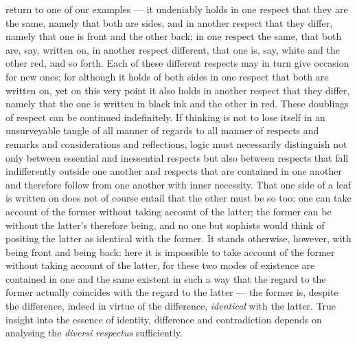 \documentclass[12pt,a4paper]{book}
\begin{document}
return to one of our examples --- it undeniably holds in one respect that they
are the same, namely that both are sides, and in another respect that they
differ, namely that one is front and the other back; in one respect the same,
that both are, say, written on, in another respect different, that one is, say,
white and the other red, and so forth. Each of these different respects may in
turn give occasion for new ones; for although it holds of both sides in one
respect that both are written on, yet on this very point it also holds in
another respect that they differ, namely that the one is written in black ink
and the other in red. These doublings of respect can be continued indefinitely.
If thinking is not to lose itself in an unsurveyable tangle of all manner of
regards to all manner
of respects and remarks and considerations and reflections, logic must
necessarily distinguish not only between essential and inessential respects but
also between respects that fall indifferently outside one another and respects
that are contained in one another and therefore follow from one another with
inner necessity. That one side of a leaf is written on does not of course
entail that the other must be so too; one can take account of the former
without taking account of the latter; the former can be without the latter's
therefore being, and no one but sophists would think of positing the latter as
identical with the former. It stands otherwise, however, with being front and
being back: here it is impossible to take account of the former without taking
account of the latter, for these two modes of existence are contained in one
and the same existent in such a way that the regard to the former actually
coincides with the regard to the latter --- the former is, despite the
difference, indeed in virtue of the difference, \emph{identical} with the
latter. True insight into the essence of identity, difference and contradiction
depends on analysing the \textit{diversi respectus} sufficiently.
\end{document}
